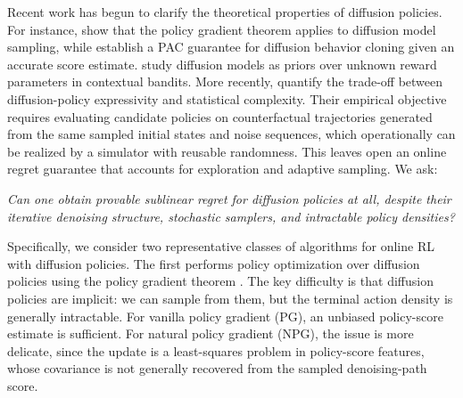 
Recent work has begun to clarify the theoretical properties of diffusion policies. For instance, \citet{psenka2024learningdiffusionmodelpolicy} show that the policy gradient theorem \citep{sutton1999policygradient} applies to diffusion model sampling, while \citet{yang2023policyrepresentationdiffusionprobability} establish a PAC guarantee for diffusion behavior cloning given an accurate score estimate. \citet{kveton2024onlineposterior} study diffusion models as priors over unknown reward parameters in contextual bandits. More recently, \citet{vu2026expressivity} quantify the trade-off between diffusion-policy expressivity and statistical complexity. Their empirical objective requires evaluating candidate policies on counterfactual trajectories generated from the same sampled initial states and noise sequences, which operationally can be realized by a simulator with reusable randomness. This leaves open an online regret guarantee that accounts for exploration and adaptive sampling. We ask:
\begin{center}
    \textit{Can one obtain provable sublinear regret for diffusion policies at all, despite their iterative denoising structure, stochastic samplers, and intractable policy densities?}
\end{center}
Specifically, we consider two representative classes of algorithms for online RL with diffusion policies. The first performs policy optimization over diffusion policies using the policy gradient theorem \citep{ren2024diffusionpolicypolicyoptimization}. The key difficulty is that diffusion policies are implicit: we can sample from them, but the terminal action density is generally intractable. For vanilla policy gradient (PG), an unbiased policy-score estimate is sufficient. For natural policy gradient (NPG), the issue is more delicate, since the update is a least-squares problem in policy-score features, whose covariance is not generally recovered from the sampled denoising-path score.

